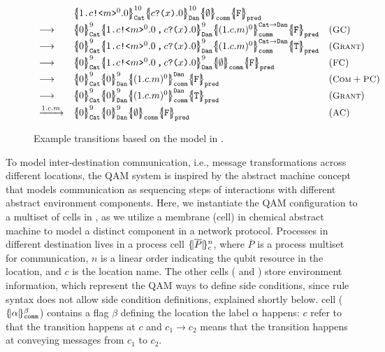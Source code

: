 \begin{figure}[t]
{\footnotesize
\[
\begin{array}{lll}
&
\pcellb{\qsend{1}{c}{m}^0.0}{10}{\cn{Cat}}
\pcellb{\qrev{c}{x}.0}{10}{\cn{Dan}} 
\qcellb{\emptyset}{\cn{comm}}
\qcellb{\texttt{F}}{\cn{pred}}
&
\\[0.3em]
\longrightarrow
&
\pcellb{0}{9}{\cn{Cat}}
\pcellb{\pard{\qsend{1}{c}{m}^0.0}{\qrev{c}{x}.0}}{9}{\cn{Dan}} 
\pcellb{(1.c.m)^0}{\cn{Cat}\rightarrow\cn{Dan}}{\cn{comm}}
\qcellb{\texttt{F}}{\cn{pred}}
&
(\rulelab{GC})
\\[0.3em]
\longrightarrow
&
\pcellb{0}{9}{\cn{Cat}}
\pcellb{\pard{\qsend{1}{c}{m}^0.0}{\qrev{c}{x}.0}}{9}{\cn{Dan}} 
\pcellb{(1.c.m)^0}{\cn{Cat}\rightarrow\cn{Dan}}{\cn{comm}}
\qcellb{\texttt{T}}{\cn{pred}}
&
(\rulelab{Grant})
\\[0.3em]
\longrightarrow
&
\pcellb{0}{9}{\cn{Cat}}
\pcellb{\pard{\qsend{1}{c}{m}^0.0}{\qrev{c}{x}.0}}{9}{\cn{Dan}} 
\qcellb{\emptyset}{\cn{comm}}
\qcellb{\texttt{F}}{\cn{pred}}
&
(\rulelab{FC})
\\[0.3em]
\longrightarrow
&
\pcellb{0}{9}{\cn{Cat}}
\pcellb{0}{9}{\cn{Dan}} 
\pcellb{(1.c.m)^0}{\cn{Dan}}{\cn{comm}}
\qcellb{\texttt{F}}{\cn{pred}}
&
(\rulelab{Com}+\rulelab{PC})
\\[0.3em]
\longrightarrow
&
\pcellb{0}{9}{\cn{Cat}}
\pcellb{0}{9}{\cn{Dan}} 
\pcellb{(1.c.m)^0}{\cn{Dan}}{\cn{comm}}
\qcellb{\texttt{T}}{\cn{pred}}
&
(\rulelab{Grant})
\\[0.3em]
\xrightarrow{1.c.m}&
\pcellb{0}{9}{\cn{Cat}}
\pcellb{0}{9}{\cn{Dan}} 
\qcellb{\emptyset}{\cn{comm}}
\qcellb{\texttt{F}}{\cn{pred}}
&
(\rulelab{AC})
\end{array}
\]
}
\caption{Example transitions based on the model in .}
  \label{fig:q-pi-example}
\end{figure}

To model inter-destination communication, i.e., message transformations across different locations,
the QAM system is inspired by the abstract machine concept that models communication as sequencing steps of
interactions with different abstract environment components.
Here, we instantiate the QAM configuration to a multiset of cells in ,
as we utilize a membrane (cell) in chemical abstract machine to model a distinct component in a network protocol.
Processes in different destination lives in a process cell $\{\!| \overline{P} |\!\}^{n}_{c}$, where $\overline{P}$ is a process multiset for communication, $n$ is a linear order indicating the qubit resource in the location, and $c$ is the location name.
The other cells ( and ) store environment information, which represent the QAM ways to define side conditions, since rule syntax does not allow side condition definitions, explained shortly below. 
 cell ($\{\!| \alpha |\!\}^{\beta}_{\texttt{comm}}$) contains a flag $\beta$ defining the location the label $\alpha$ happens: $c$ refer to that the transition happens at $c$ and $c_1\rightarrow c_2$ means that the transition happens at conveying messages from $c_1$ to $c_2$.


